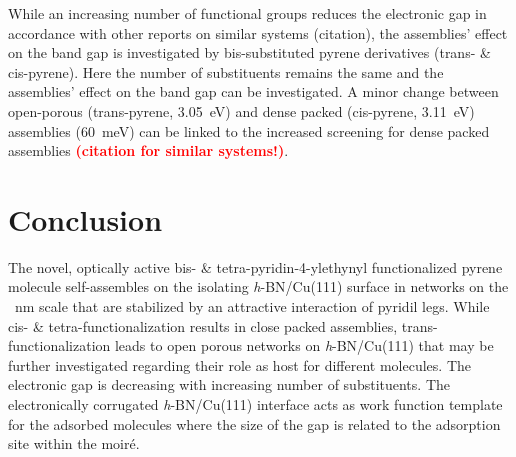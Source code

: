 While an increasing number of functional groups reduces the electronic gap in accordance with other reports on similar systems (citation), the assemblies’ effect on the band gap is investigated by bis-substituted pyrene derivatives (trans- \& cis-pyrene). Here the number of substituents remains the same and the assemblies’ effect on the band gap can be investigated. A minor change between open-porous (trans-pyrene, \SI{3.05}{\eV}) and dense packed (cis-pyrene, \SI{3.11}{\eV}) assemblies (\SI{60}{\milli \eV}) can be linked to the increased screening for dense packed assemblies \textcolor{red}{\textbf{(citation for similar systems!)}}.


\section{Conclusion}
The novel, optically active bis- \& tetra-pyridin-4-ylethynyl functionalized pyrene molecule self-assembles on the isolating \textit{h}-BN/Cu(111) surface in networks on the \SI{}{\nano \meter} scale that are stabilized by an attractive interaction of pyridil legs. While cis- \& tetra-functionalization results in close packed assemblies, trans-functionalization leads to open porous networks on \textit{h}-BN/Cu(111) that may be further investigated regarding their role as host for different molecules. The electronic gap is decreasing with increasing number of substituents. The electronically corrugated \textit{h}-BN/Cu(111) interface acts as work function template for the adsorbed molecules where the size of the gap is related to the adsorption site within the moir\'e. 
